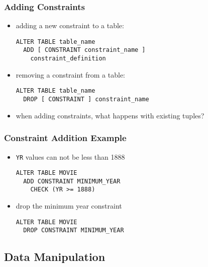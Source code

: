 \documentclass[dvipsnames]{beamer}
\theoremstyle{plain}
\begin{document}
\begin{frame}[fragile]
  \frametitle{Adding Constraints}

  \begin{itemize}
    \item adding a new constraint to a table:
    \begin{lstlisting}
ALTER TABLE table_name
  ADD [ CONSTRAINT constraint_name ]
    constraint_definition
    \end{lstlisting}

   \item removing a constraint from a table:
    \begin{lstlisting}
ALTER TABLE table_name
  DROP [ CONSTRAINT ] constraint_name
    \end{lstlisting}

    \pause
    \item when adding constraints, what happens with existing tuples?
  \end{itemize}
\end{frame}

\begin{frame}[fragile]
  \frametitle{Constraint Addition Example}

  \begin{itemize}
    \item \texttt{YR} values can not be less than 1888
    \begin{lstlisting}
ALTER TABLE MOVIE
  ADD CONSTRAINT MINIMUM_YEAR
    CHECK (YR >= 1888)
    \end{lstlisting}
  \end{itemize}

  \begin{itemize}
    \item drop the minimum year constraint
    \begin{lstlisting}
ALTER TABLE MOVIE
  DROP CONSTRAINT MINIMUM_YEAR
    \end{lstlisting}
  \end{itemize}
\end{frame}

\subsection{Data Manipulation}
\end{document}
